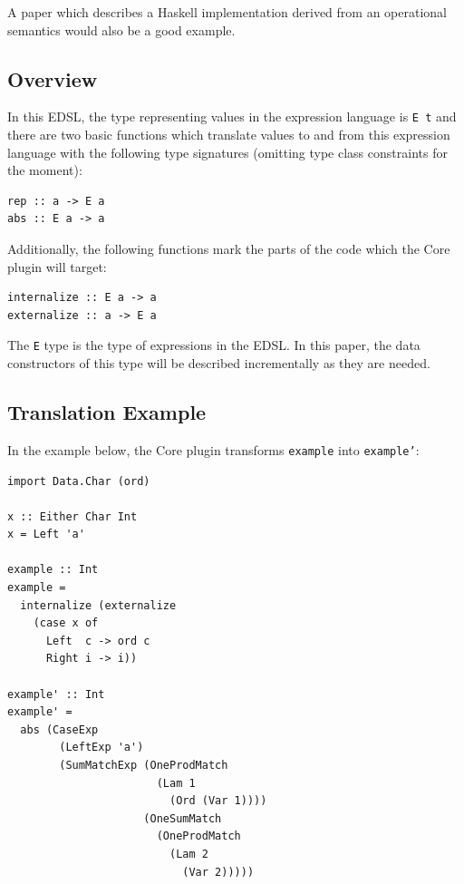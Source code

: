 \documentclass[sigplan,anonymous,review]{acmart}
\newcommand{\ttt}{\texttt}
\newcommand{\showtodos}{}  %
\newenvironment{todo}
  {\ifthenelse{\isundefined{\showtodos}}{\comment}{\begin{tcolorbox}
    \textbf{TODO}:}}
  {\ifthenelse{\isundefined{\showtodos}}{\endcomment}{\end{tcolorbox}}
  }
\newenvironment{todont}
               {\comment}
               {\endcomment}
\begin{document}
\begin{todont}

  A paper which describes a Haskell implementation derived from an operational
  semantics would also be a good example.
\end{todont}

\subsection{Overview}
\label{sec:Overview}

In this EDSL, the type representing values in the expression language is \ttt{E
t} and there are two basic functions which translate values to and from this
expression language with the following type signatures (omitting type class
constraints for the moment):

\begin{lstlisting}
rep :: a -> E a
abs :: E a -> a
\end{lstlisting}

Additionally, the following functions mark the parts of the code which the Core
plugin will target:

\begin{lstlisting}
internalize :: E a -> a
externalize :: a -> E a
\end{lstlisting}

The \ttt{E} type is the type of expressions in the EDSL.  In this paper, the
data constructors of this type will be described incrementally as they
are needed.

\subsection{Translation Example}


In the example below, the Core plugin transforms \ttt{example} into \ttt{example'}:
\begin{lstlisting}[deletekeywords={Ord}]
import Data.Char (ord)

x :: Either Char Int
x = Left 'a'

example :: Int
example =
  internalize (externalize
    (case x of
      Left  c -> ord c
      Right i -> i))

example' :: Int
example' =
  abs (CaseExp
        (LeftExp 'a')
        (SumMatchExp (OneProdMatch
                       (Lam 1
                         (Ord (Var 1))))
                     (OneSumMatch
                       (OneProdMatch
                         (Lam 2
                           (Var 2)))))
\end{lstlisting}
\end{document}

